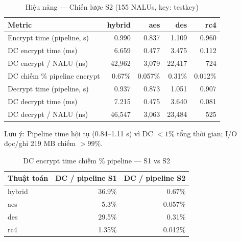 \begin{table}[ht]
\centering
\caption{Hiệu năng — Chiến lược S2 (155 NALUs, key: testkey)}
\label{tab:perf_s2}
\begin{tabular}{lrrrr}
\toprule
Metric & hybrid & aes & des & rc4 \\
\midrule
Encrypt time (pipeline, s)  & 0.990 & 0.837 & 1.109 & 0.960 \\
DC encrypt time (ms)        & 6.659 & 0.477 & 3.475 & 0.112 \\
DC encrypt / NALU (ns)      & 42{,}962 & 3{,}079 & 22{,}417 & 724 \\
DC chiếm \% pipeline encrypt & 0.67\% & 0.057\% & 0.31\% & 0.012\% \\
Decrypt time (pipeline, s)  & 0.937 & 0.873 & 1.051 & 0.907 \\
DC decrypt time (ms)        & 7.215 & 0.475 & 3.640 & 0.081 \\
DC decrypt / NALU (ns)      & 46{,}547 & 3{,}063 & 23{,}484 & 525 \\
\bottomrule
\end{tabular}
\begin{tablenotes}
\small
\item Lưu ý: Pipeline time hội tụ (0.84--1.11 s) vì DC $< 1\%$ tổng thời gian;
I/O đọc/ghi 219 MB chiếm $> 99\%$.
\end{tablenotes}
\end{table}

\begin{table}[ht]
\centering
\caption{DC encrypt time chiếm \% pipeline — S1 vs S2}
\label{tab:dc_percent}
\begin{tabular}{lrr}
\toprule
Thuật toán & DC / pipeline S1 & DC / pipeline S2 \\
\midrule
hybrid & 36.9\% & 0.67\% \\
aes    &  5.3\% & 0.057\% \\
des    & 29.5\% & 0.31\% \\
rc4    &  1.35\% & 0.012\% \\
\bottomrule
\end{tabular}
\end{table}

